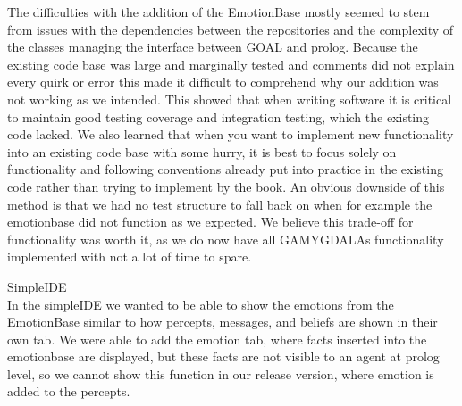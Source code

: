 \documentclass[11pt]{article}
\begin{document}
The difficulties with the addition of the EmotionBase mostly seemed to stem from issues with the dependencies between the repositories and the complexity of the classes managing the interface between GOAL and prolog. Because the existing code base was large and marginally tested and comments did not explain every quirk or error this made it difficult to comprehend why our addition was not working as we intended. This showed that when writing software it is critical to maintain good testing coverage and integration testing, which the existing code lacked. We also learned that when you want to implement new functionality into an existing code base with some hurry, it is best to focus solely on functionality and following conventions already put into practice in the existing code rather than trying to implement by the book. An obvious downside of this method is that we had no test structure to fall back on when for example the emotionbase did not function as we expected. We believe this trade-off for functionality was worth it, as we do now have all GAMYGDALAs functionality implemented with not a lot of time to spare.\par
SimpleIDE\\
In the simpleIDE we wanted to be able to show the emotions from the EmotionBase similar to how percepts, messages, and beliefs are shown in their own tab. We were able to add the emotion tab, where facts inserted into the emotionbase are displayed, but these facts are not visible to an agent at prolog level, so we cannot show this function in our release version, where emotion is added to the percepts.
\end{document}
